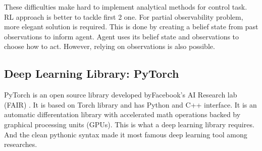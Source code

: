These difficulties make hard to implement analytical methods for control task. RL approach is better to tackle first 2 one. For partial observability problem, more elegant solution is required. This is done by creating a belief state from past observations to inform agent. Agent uses its belief state and observations to choose how to act. However, relying on observations is also possible. \\
\subsection{Deep Learning Library: PyTorch}
\label{dl_pytorch}
PyTorch is an open source library developed byFacebook's AI Research lab (FAIR) \cite{paszke_pytorch_2019}. It is based on Torch library \cite{collobert_torch7_2011} and has Python and C++ interface. It is an automatic differentation library with accelerated math operations backed by graphical processing units (GPUs). This is what a deep learning library requires. And the clean pythonic syntax made it most famous deep learning tool among researches. 
